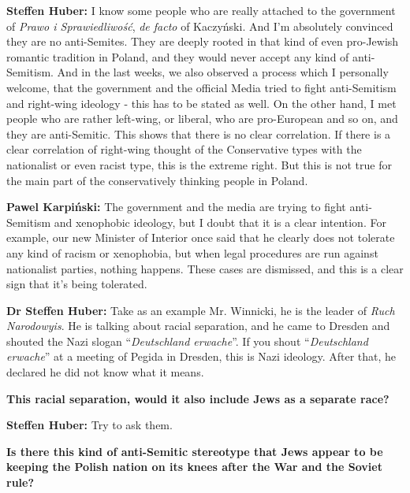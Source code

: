 \textbf{Steffen Huber:} I know some people who are really attached to the government of \textit{Prawo i Sprawiedliwość}, \textit{de facto} of Kaczyński. And I'm absolutely convinced they are no anti-Semites. They are deeply rooted in that kind of even pro-Jewish romantic tradition in Poland, and they would never accept any kind of anti-Semitism. And in the last weeks, we also observed a process which I personally welcome, that the government and the official Media tried to fight anti-Semitism and right-wing ideology - this has to be stated as well. On the other hand, I met people who are rather left-wing, or liberal, who are pro-European and so on, and they are anti-Semitic. This shows that there is no clear correlation. If there is a clear correlation of right-wing thought of the Conservative types with the nationalist or even racist type, this is the extreme right. But this is not true for the main part of the conservatively thinking people in Poland. \par
\textbf{Pawel Karpiński:} The government and the media are trying to fight anti-Semitism and xenophobic ideology, but I doubt that it is a clear intention. For example, our new Minister of Interior once said that he clearly does not tolerate any kind of racism or xenophobia, but when legal procedures are run against nationalist parties, nothing happens. These cases are dismissed, and this is a clear sign that it’s being tolerated.\par
\textbf{Dr Steffen Huber:} Take as an example Mr. Winnicki, he is the leader of \textit{Ruch Narodowyis}. He is talking about racial separation, and he came to Dresden and shouted the Nazi slogan “\textit{Deutschland erwache}”. If you shout “\textit{Deutschland erwache}” at a meeting of Pegida in Dresden, this is Nazi ideology. After that, he declared he did not know what it means.  

\textbf{This racial separation, would it also include Jews as a separate race?}

\textbf{Steffen Huber:} Try to ask them.  

\textbf{Is there this kind of anti-Semitic stereotype that Jews appear to be keeping the Polish nation on its knees after the War and the Soviet rule?} 


